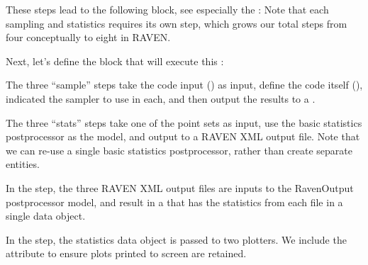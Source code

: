 These steps lead to the following  block, see especially the :
Note that each sampling and statistics requires its own step, which grows our total steps from four
conceptually to eight in RAVEN.

Next, let's define the  block that will execute this :

The three ``sample'' steps take the code input () as input, define the code itself
(), indicated the sampler to use in each, and then output the results to a
.

The three ``stats'' steps take one of the point sets as input, use the basic statistics postprocessor as the
model, and output to a RAVEN XML output file.  Note that we can re-use a single basic statistics
postprocessor, rather than create separate entities.

In the  step, the three RAVEN XML output files are inputs to the RavenOutput
postprocessor model, and result in a  that has the statistics from each file in a single
data object.

In the  step, the statistics data object is passed to two  plotters.  We
include the  attribute to ensure plots printed to screen are retained.

